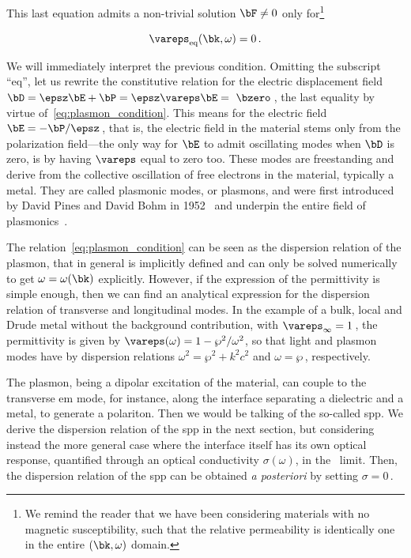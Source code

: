 \noindent This last equation admits a non-trivial solution $\bF \neq 0$ only for\footnote{We remind the reader that we have been considering materials with no magnetic susceptibility, such that the relative permeability is identically one in the entire $(\bk,\omega)$ domain.}

\begin{equation}
    \label{eq:plasmon_condition}
    \vareps_{\text{eq}}(\bk,\omega) = 0\,.
\end{equation}

\noindent We will immediately interpret the previous condition.
Omitting the subscript \enquote{eq}, let us rewrite the constitutive relation for the electric displacement field $\bD = \epsz \bE + \bP = \epsz \vareps \bE =~\bzero$\,, the last equality by virtue of~\eqref{eq:plasmon_condition}.
This means for the electric field $\bE = -\bP/\epsz$\,, that is, the electric field in the material stems only from the polarization field---the only way for $\bE$ to admit oscillating modes when $\bD$ is zero, is by having $\vareps$ equal to zero too.
These modes are freestanding and derive from the collective oscillation of free electrons in the material, typically a metal.
They are called plasmonic modes, or plasmons, and were first introduced by David Pines and David Bohm in 1952~\cite{Pines_Bohm_1952} and underpin the entire field of plasmonics~\cite{Cosme_2025,GoncalvesPeres:2016,Andre_Goncalves_2020,maier_plasmonics_2007,Ellie_2024}.

The relation~\eqref{eq:plasmon_condition} can be seen as the dispersion relation of the plasmon, that in general is implicitly defined and can only be solved numerically to get $\omega = \omega(\bk)$ explicitly.
However, if the expression of the permittivity is simple enough, then we can find an analytical expression for the dispersion relation of transverse and longitudinal modes.
In the example of a bulk, local and Drude metal without the background contribution, with $\vareps_\infty = 1$\,, the permittivity is given by $\vareps(\omega) = 1 -\wp^2/\omega^2$, so that light and plasmon modes have by dispersion relations $\omega^2 = \wp^2 + k^2 c^2$ and $\omega = \wp$\,, respectively.

The plasmon, being a dipolar excitation of the material, can couple to the transverse \gls{em} mode, for instance, along the interface separating a dielectric and a metal, to generate a polariton.
Then we would be talking of the so-called \gls{spp}\@.
We derive the dispersion relation of the \gls{spp} in the next section, but considering instead the more general case where the interface itself has its own optical response, quantified through an optical conductivity $\sigma(\omega)$, in the \lra~limit.
Then, the dispersion relation of the \gls{spp} can be obtained \textit{a posteriori} by setting $\sigma = 0$\,.

